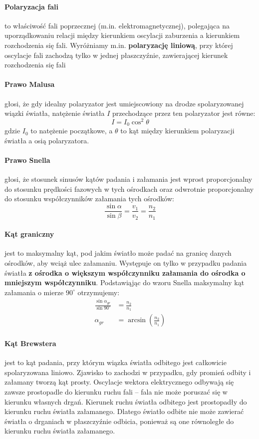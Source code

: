 \documentclass[a4paper]{article}
\begin{document}
\paragraph*{Polaryzacja fali} to właściwość fali poprzecznej (m.in. elektromagnetycznej), polegająca na uporządkowaniu relacji między kierunkiem oscylacji zaburzenia a kierunkiem rozchodzenia się fali. \cite{wiki}
Wyróżniamy m.in. \textbf{polaryzację liniową}, przy której oscylacje fali zachodzą tylko w jednej płaszczyźnie, zawierającej kierunek rozchodzenia się fali

\paragraph*{Prawo Malusa} głosi, że gdy idealny polaryzator jest umiejscowiony na drodze spolaryzowanej wiązki światła, natężenie światła $I$ przechodzące przez ten polaryzator jest równe:
\[
	I = I_0 \cos^2 \theta
\]
gdzie $I_0$ to natężenie początkowe, a $\theta$ to kąt między kierunkiem polaryzacji światła a osią polaryzatora.

\paragraph*{Prawo Snella} głosi, że stosunek sinusów kątów padania i załamania jest wprost proporcjonalny do stosunku prędkości fazowych w tych ośrodkach oraz odwrotnie proporcjonalny do stosunku współczynników załamania tych ośrodków:
\[
	\frac{\sin \alpha}{\sin \beta} = \frac{v_1}{v_2} = \frac{n_2}{n_1}
\]

\paragraph*{Kąt graniczny} jest to maksymalny kąt, pod jakim światło może padać na granicę danych ośrodków, aby wciąż ulec załamaniu. Występuje on tylko w przypadku padania światła \textbf{z ośrodka o większym współczynniku załamania do ośrodka o mniejszym współczynniku}. Podstawiąjąc do wzoru Snella maksymalny kąt załamania o mierze $90^\circ$ otrzymujemy:
\begin{align*}
	\frac{\sin \alpha_{gr}}{\sin 90^\circ} &= \frac{n_2}{n_1} \\
	\alpha_{gr} &= \arcsin \left(\frac{n_2}{n_1}\right)
\end{align*}

\paragraph*{Kąt Brewstera} jest to kąt padania, przy którym wiązka światła odbitego jest całkowicie spolaryzowana liniowo. Zjawisko to zachodzi w przypadku, gdy promień odbity i załamany tworzą kąt prosty. 
Oscylacje wektora elektrycznego odbywają się zawsze prostopadle do kierunku ruchu fali -- fala nie może poruszać się w kierunku własnych drgań.
Kierunek ruchu światła odbitego jest prostopadły do kierunku ruchu światła załamanego.
Dlatego światło odbite nie może zawierać światła o drganiach w płaszczyźnie odbicia, ponieważ są one równoległe do kierunku ruchu światła załamanego.
\end{document}
